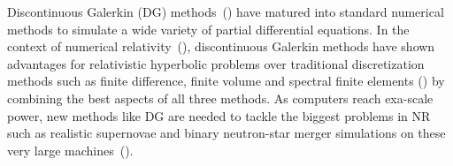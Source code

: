 


Discontinuous Galerkin (DG) methods~(\cite{Reed.W;Hill.T1973,hesthaven2008nodal, Cock01,cockburn1998runge,Cockburn.B;Karniadakis.G;Shu.C2000})
have matured into standard numerical methods  to simulate a wide
variety of partial differential equations. In the context of numerical
relativity~(\cite{baumgarte2010numerical}), discontinuous Galerkin
methods have shown advantages for relativistic hyperbolic problems
over traditional discretization methods such as finite difference, finite volume and
spectral finite elements
(\cite{Field:2010mn,brown2012numerical,field2009discontinuous,zumbusch2009,Radice:2011qr,mocz:14,zanotti:14,endeve:15,teukolsky2015,Bugner:2015gqa,schaal2015astrophysicalfixed,zanotti2015,Miller:2016vik}) by combining the best aspects of all three methods. As computers reach exa-scale power, new methods like DG are needed to tackle the biggest problems in NR such as realistic supernovae and binary neutron-star merger simulations on these very large machines~(\cite{kidder:16}).

